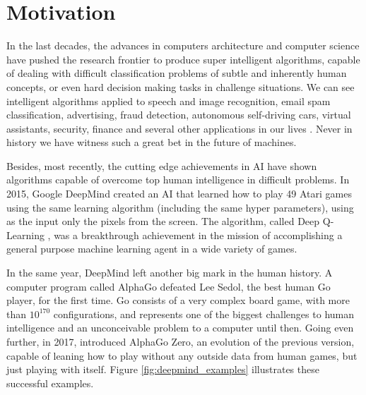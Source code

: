 \section{Motivation}


In the last decades, the advances in computers architecture and computer science have pushed the research frontier to produce super intelligent algorithms, capable of dealing with difficult classification problems of subtle and inherently human concepts, or even hard decision making tasks in challenge situations. We can see intelligent algorithms applied to speech and image recognition, email spam classification, advertising, fraud detection, autonomous self-driving cars, virtual assistants, security, finance and several other applications in our lives \cite{AIapplications}. Never in history we have witness such a great bet in the future of machines.


Besides, most recently, the cutting edge achievements in AI have shown algorithms capable of overcome top human intelligence in difficult problems. In 2015, Google DeepMind created an AI that learned how to play 49 Atari games using the same learning algorithm (including the same hyper parameters), using as the input only the pixels from the screen. The algorithm, called Deep Q-Learning \cite{RLNature2015}, was a breakthrough achievement in the mission of accomplishing a general purpose machine learning agent in a wide variety of games.

In the same year, DeepMind left another big mark in the human history. A computer program called AlphaGo defeated Lee Sedol, the best human Go player, for the first time. Go consists of a very complex board game, with more than $10^{170}$ configurations, and represents one of the biggest challenges to human intelligence and an unconceivable problem to a computer until then. Going even further, in 2017,  introduced AlphaGo Zero, an evolution of the previous version, capable of leaning how to play without any outside data from human games, but just playing with itself. Figure \ref{fig:deepmind_examples} illustrates these successful examples.

